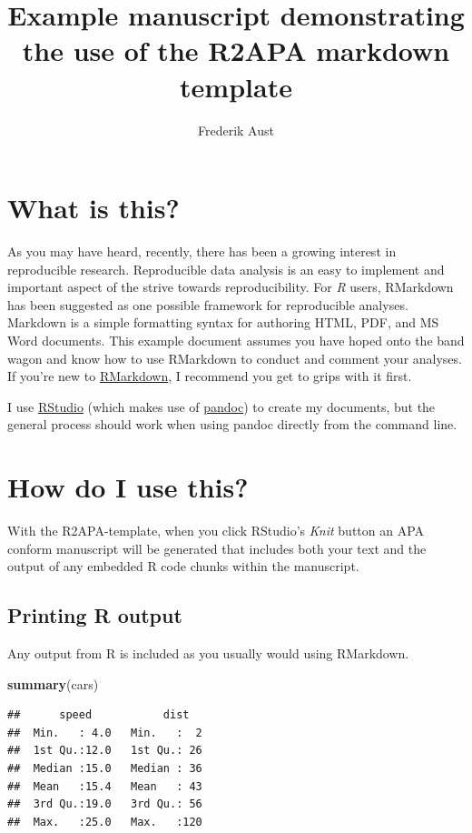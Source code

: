 \documentclass[american,man]{apa6}
\title{Example manuscript demonstrating the use of the R2APA markdown template}
\author{Frederik Aust}
\affiliation{University of Cologne}
\newenvironment{Shaded}{\begin{snugshade}}{\end{snugshade}}
\newcommand{\KeywordTok}[1]{\textcolor[rgb]{0.13,0.29,0.53}{\textbf{{#1}}}}
\newcommand{\NormalTok}[1]{{#1}}
\begin{document}
\maketitle

\section{What is this?}\label{what-is-this}

As you may have heard, recently, there has been a growing interest in
reproducible research. Reproducible data analysis is an easy to
implement and important aspect of the strive towards reproducibility.
For \emph{R} users, RMarkdown has been suggested as one possible
framework for reproducible analyses. Markdown is a simple formatting
syntax for authoring HTML, PDF, and MS Word documents. This example
document assumes you have hoped onto the band wagon and know how to use
RMarkdown to conduct and comment your analyses. If you're new to
\href{http://rmarkdown.rstudio.com/}{RMarkdown}, I recommend you get to
grips with it first.

I use \href{http://www.rstudio.com/}{RStudio} (which makes use of
\href{http://johnmacfarlane.net/pandoc/}{pandoc}) to create my
documents, but the general process should work when using pandoc
directly from the command line.

\section{How do I use this?}\label{how-do-i-use-this}

With the R2APA-template, when you click RStudio's \emph{Knit} button an
APA conform manuscript will be generated that includes both your text
and the output of any embedded R code chunks within the manuscript.

\subsection{Printing R output}\label{printing-r-output}

Any output from R is included as you usually would using RMarkdown.

\begin{Shaded}
\begin{Highlighting}[]
\KeywordTok{summary}\NormalTok{(cars)}
\end{Highlighting}
\end{Shaded}

\begin{verbatim}
##      speed           dist    
##  Min.   : 4.0   Min.   :  2  
##  1st Qu.:12.0   1st Qu.: 26  
##  Median :15.0   Median : 36  
##  Mean   :15.4   Mean   : 43  
##  3rd Qu.:19.0   3rd Qu.: 56  
##  Max.   :25.0   Max.   :120
\end{verbatim}
\end{document}
